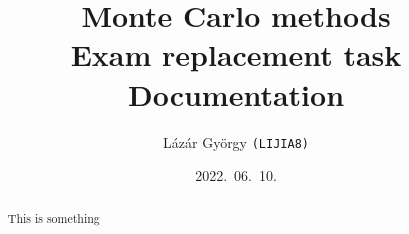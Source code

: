 \documentclass[a4paper,12pt]{article}
\title{\bf Monte Carlo methods \\ Exam replacement task \\ Documentation}
\author{ {Lázár György \tt (LIJIA8)}\\
}
\date{2022.\ 06.\ 10.} %
\begin{document}
\maketitle
\begin{abstract}
This is something
\end{abstract}
\end{document}
